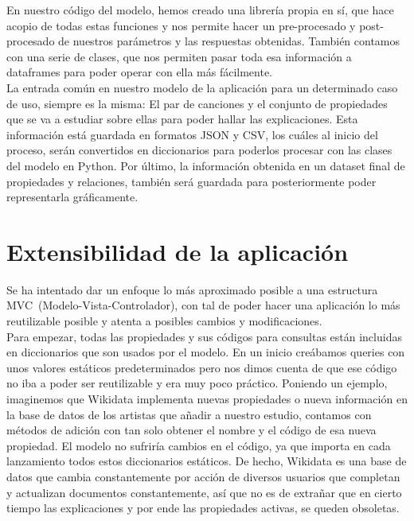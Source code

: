 En nuestro código del modelo, hemos creado una librería propia en sí, que hace acopio de todas estas funciones y nos permite hacer un pre-procesado y post-procesado de nuestros parámetros y las respuestas obtenidas. También contamos con una serie de clases, que nos permiten pasar toda esa información a dataframes para poder operar con ella más fácilmente.\\

La entrada común en nuestro modelo de la aplicación para un determinado caso de uso, siempre es la misma: El par de canciones y el conjunto de propiedades que se va a estudiar sobre ellas para poder hallar las explicaciones. Esta información está guardada en formatos JSON y CSV, los cuáles al inicio del proceso, serán convertidos en diccionarios para poderlos procesar con las clases del modelo en Python. Por último, la información obtenida en un dataset final de propiedades y relaciones, también será guardada para posteriormente poder representarla gráficamente.\\


\section{Extensibilidad de la aplicación}

Se ha intentado dar un enfoque lo más aproximado posible a una estructura MVC~(Modelo-Vista-Controlador), con tal de poder hacer una aplicación lo más reutilizable posible y atenta a posibles cambios y modificaciones.\\

Para empezar, todas las propiedades y sus códigos para consultas están incluidas en diccionarios que son usados por el modelo. En un inicio creábamos queries con unos valores estáticos predeterminados pero nos dimos cuenta de que ese código no iba a poder ser reutilizable y era muy poco práctico. Poniendo un ejemplo, imaginemos que Wikidata implementa nuevas propiedades o nueva información en la base de datos de los artistas que añadir a nuestro estudio, contamos con métodos de adición con tan solo obtener el nombre y el código de esa nueva propiedad. El modelo no sufriría cambios en el código, ya que importa en cada lanzamiento todos estos diccionarios estáticos. De hecho, Wikidata es una base de datos que cambia constantemente por acción de diversos usuarios que completan y actualizan documentos constantemente, así que no es de extrañar que en cierto tiempo las explicaciones y por ende las propiedades activas, se queden obsoletas.\\


